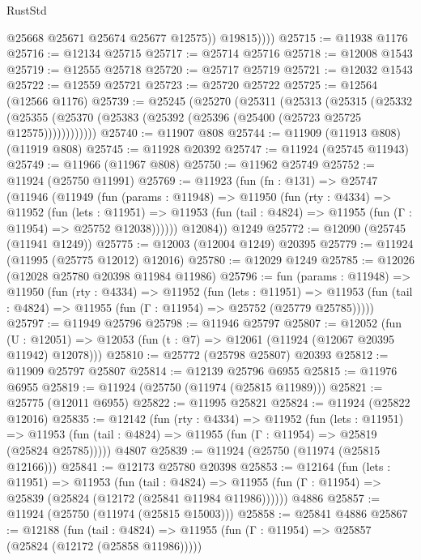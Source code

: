 \begin{lexlean}{RustStd}
\begin{coremodule}
                @25668
                @25671
                @25674
                @25677
                @12575))
            @19815))))
@25715 := @11938 @1176
@25716 := @12134 @25715
@25717 := @25714 @25716
@25718 := @12008 @1543
@25719 := @12555 @25718
@25720 := @25717 @25719
@25721 := @12032 @1543
@25722 := @12559 @25721
@25723 := @25720 @25722
@25725 := @12564 (@12566 @1176)
@25739 := @25245
    (@25270
      (@25311
        (@25313
          (@25315
            (@25332
              (@25355 (@25370 (@25383 (@25392 (@25396 (@25400 (@25723 @25725 @12575))))))))))))
@25740 := @11907 @808
@25744 := @11909 (@11913 @808) (@11919 @808)
@25745 := @11928 @20392
@25747 := @11924 (@25745 @11943)
@25749 := @11966 (@11967 @808)
@25750 := @11962 @25749
@25752 := @11924 (@25750 @11991)
@25769 := @11923
    (fun (fn : @131) =>
    @25747
      (@11946
        (@11949
          (fun (params : @11948) =>
          @11950
            (fun (rty : @4334) =>
            @11952
              (fun (lets : @11951) =>
              @11953 (fun (tail : @4824) => @11955 (fun (Γ : @11954) => @25752 @12038))))))
        @12084))
    @1249
@25772 := @12090 (@25745 (@11941 @1249))
@25775 := @12003 (@12004 @1249) @20395
@25779 := @11924 (@11995 (@25775 @12012) @12016)
@25780 := @12029 @1249
@25785 := @12026 (@12028 @25780 @20398 @11984 @11986)
@25796 := fun (params : @11948) =>
  @11950
    (fun (rty : @4334) =>
    @11952
      (fun (lets : @11951) =>
      @11953 (fun (tail : @4824) => @11955 (fun (Γ : @11954) => @25752 (@25779 @25785)))))
@25797 := @11949 @25796
@25798 := @11946 @25797
@25807 := @12052
    (fun (U : @12051) => @12053 (fun (t : @7) => @12061 (@11924 (@12067 @20395 @11942) @12078)))
@25810 := @25772 (@25798 @25807) @20393
@25812 := @11909 @25797 @25807
@25814 := @12139 @25796 @6955
@25815 := @11976 @6955
@25819 := @11924 (@25750 (@11974 (@25815 @11989)))
@25821 := @25775 (@12011 @6955)
@25822 := @11995 @25821
@25824 := @11924 (@25822 @12016)
@25835 := @12142
    (fun (rty : @4334) =>
    @11952
      (fun (lets : @11951) =>
      @11953 (fun (tail : @4824) => @11955 (fun (Γ : @11954) => @25819 (@25824 @25785)))))
    @4807
@25839 := @11924 (@25750 (@11974 (@25815 @12166)))
@25841 := @12173 @25780 @20398
@25853 := @12164
    (fun (lets : @11951) =>
    @11953
      (fun (tail : @4824) =>
      @11955 (fun (Γ : @11954) => @25839 (@25824 (@12172 (@25841 @11984 @11986))))))
    @4886
@25857 := @11924 (@25750 (@11974 (@25815 @15003)))
@25858 := @25841 @4886
@25867 := @12188
    (fun (tail : @4824) => @11955 (fun (Γ : @11954) => @25857 (@25824 (@12172 (@25858 @11986)))))

\end{coremodule}
\end{lexlean}
